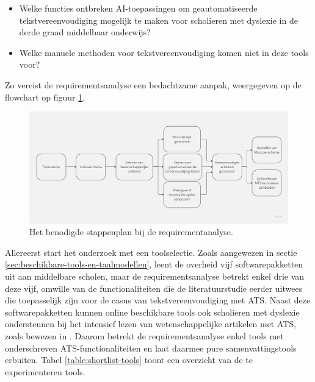 \begin{itemize}
	\item Welke functies ontbreken AI-toepassingen om geautomatiseerde tekstvereenvoudiging mogelijk te maken voor scholieren met dyslexie in de derde graad middelbaar onderwijs?
	\item Welke manuele methoden voor tekstvereenvoudiging komen niet in deze tools voor?
\end{itemize}

Zo vereist de requirementsanalyse een bedachtzame aanpak, weergegeven op de flowchart op figuur \ref{img:flowchart-requirementsanalyse}.

\begin{figure}[H]
	\includegraphics[width=\linewidth]{img/flowchart-requirementsanalyse.jpg}
	\caption{Het benodigde stappenplan bij de requirementanalyse.}
	\label{img:flowchart-requirementsanalyse}
\end{figure}

Allereerst start het onderzoek met een toolselectie. Zoals aangewezen in sectie \ref{sec:beschikbare-tools-en-taalmodellen}, leent de overheid vijf softwarepakketten uit aan middelbare scholen, maar de requirementsanalyse betrekt enkel drie van deze vijf, omwille van de functionaliteiten die de literatuurstudie eerder uitwees die toepasselijk zijn voor de casus van tekstvereenvoudiging met ATS. Naast deze softwarepakketten kunnen online beschikbare tools ook scholieren met dyslexie ondersteunen bij het intensief lezen van wetenschappelijke artikelen met ATS, zoals bewezen in \textcite{Bingel2018}. Daarom betrekt de requirementsanalyse enkel tools met onderschreven ATS-functionaliteiten en laat daarmee pure samenvattingstools erbuiten. Tabel \ref{table:shortlist-tools} toont een overzicht van de te experimenteren tools.

